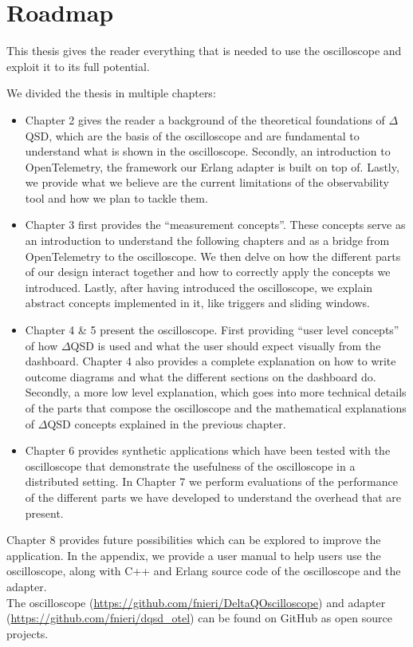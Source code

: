 \section{Roadmap}
    This thesis gives the reader everything that is needed to use the oscilloscope and exploit it to its full potential.

    We divided the thesis in multiple chapters:
    \begin{itemize}
        \item Chapter 2 gives the reader a background of the theoretical foundations of $\Delta$QSD, which are the basis of the oscilloscope and are fundamental to understand what is shown in the oscilloscope. Secondly, an introduction to OpenTelemetry, the framework our Erlang adapter is built on top of. Lastly, we provide what we believe are the current limitations of the observability tool and how we plan to tackle them.
        \item Chapter 3 first provides the ``measurement concepts''. These concepts serve as an introduction to understand the following chapters and as a bridge from OpenTelemetry to the oscilloscope.  We then delve on how the different parts of our design interact together and how to correctly apply the concepts we introduced. Lastly, after having introduced the oscilloscope, we explain abstract concepts implemented in it, like triggers and sliding windows.
        \item Chapter 4 \& 5 present the oscilloscope. First providing ``user level concepts'' of how $\Delta$QSD is used and what the user should expect visually from the dashboard. Chapter 4 also provides a complete explanation on how to write outcome diagrams and what the different sections on the dashboard do.
            Secondly, a more low level explanation, which goes into more technical details of the parts that compose the oscilloscope and the mathematical explanations of $\Delta$QSD concepts explained in the previous chapter.
        \item Chapter 6 provides synthetic applications which have been tested with the oscilloscope that demonstrate the usefulness of the oscilloscope in a distributed setting. In Chapter 7 we perform evaluations of the performance of the different parts we have developed to understand the overhead that are present.
    \end{itemize}

    Chapter 8 provides future possibilities which can be explored to improve the application. In the appendix, we provide a user manual to help users use the oscilloscope, along with C++ and Erlang source code of the oscilloscope and the adapter. \\
   \sloppy The oscilloscope (\url{https://github.com/fnieri/DeltaQOscilloscope}) and adapter (\url{https://github.com/fnieri/dqsd_otel}) can be found on GitHub as open source projects.
